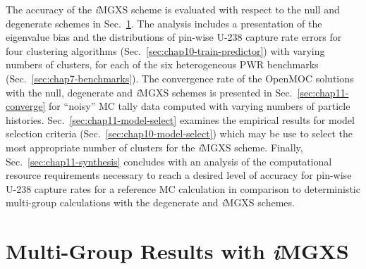 The accuracy of the \textit{i}\ac{MGXS} scheme is evaluated with respect to the null and degenerate schemes in Sec.~\ref{subsec:chap11-imgxs-results}. The analysis includes a presentation of the eigenvalue bias and the distributions of pin-wise U-238 capture rate errors for four clustering algorithms (Sec.~\ref{sec:chap10-train-predictor}) with varying numbers of clusters, for each of the six heterogeneous \ac{PWR} benchmarks (Sec.~\ref{sec:chap7-benchmarks}). The convergence rate of the OpenMOC solutions with the null, degenerate and \textit{i}\ac{MGXS} schemes is presented in Sec.~\ref{sec:chap11-converge} for ``noisy'' \ac{MC} tally data computed with varying numbers of particle histories. Sec.~\ref{sec:chap11-model-select} examines the empirical results for model selection criteria (Sec.~\ref{sec:chap10-model-select}) which may be use to select the most appropriate number of clusters for the \textit{i}\ac{MGXS} scheme. Finally, Sec.~\ref{sec:chap11-synthesis} concludes with an analysis of the computational resource requirements necessary to reach a desired level of accuracy for pin-wise U-238 capture rates for a reference \ac{MC} calculation in comparison to deterministic multi-group calculations with the degenerate and \textit{i}\ac{MGXS} schemes.


\section{Multi-Group Results with \textit{i}MGXS}
\label{subsec:chap11-imgxs-results}

